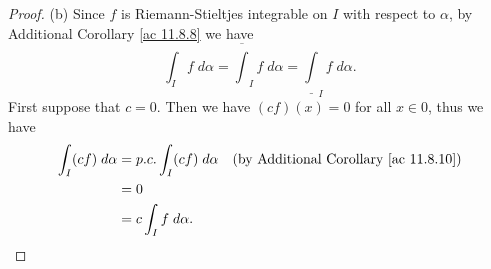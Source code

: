 \begin{proof}{(b)}
    Since \(f\) is Riemann-Stieltjes integrable on \(I\) with respect to \(\alpha\), by Additional Corollary \ref{ac 11.8.8} we have
    \[
        \int_I f \; d \alpha = \overline{\int}_I f \; d \alpha = \underline{\int}_I f \; d \alpha.
    \]
    First suppose that \(c = 0\).
    Then we have \((cf)(x) = 0\) for all \(x \in 0\), thus we have
    \begin{align*}
        \int_I (cf) \; d \alpha & = p.c. \int_I (cf) \; d \alpha & \text{(by Additional Corollary \ref{ac 11.8.10})} \\
                                & = 0                                                                                \\
                                & = c \int_I f \; d \alpha.
    \end{align*}


\end{proof}
